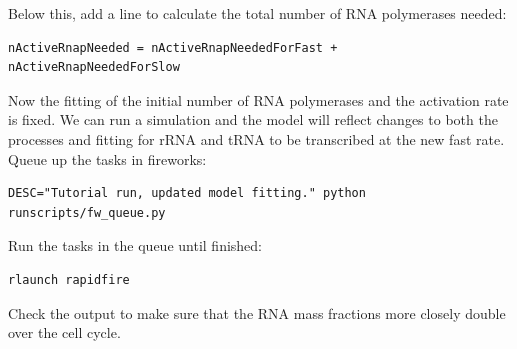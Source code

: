\documentclass[12pt]{article}
\begin{document}
Below this, add a line to calculate the total number of RNA polymerases needed:

\begin{lstlisting}
nActiveRnapNeeded = nActiveRnapNeededForFast + nActiveRnapNeededForSlow
\end{lstlisting}

Now the fitting of the initial number of RNA polymerases and the activation rate is fixed. We can run a simulation and the model will reflect changes to both the processes and fitting for rRNA and tRNA to be transcribed at the new fast rate. Queue up the tasks in fireworks:

\lstset{language=bash}
\begin{lstlisting}
DESC="Tutorial run, updated model fitting." python runscripts/fw_queue.py
\end{lstlisting}

Run the tasks in the queue until finished:

\begin{lstlisting}
rlaunch rapidfire
\end{lstlisting}

Check the output to make sure that the RNA mass fractions more closely double over the cell cycle.
\end{document}
